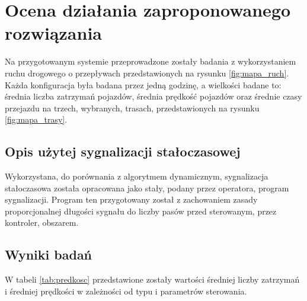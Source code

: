 \chapter{Ocena działania zaproponowanego rozwiązania}
\label{chap:ocena}
Na przygotowanym systemie przeprowadzone zostały badania z wykorzystaniem ruchu drogowego o przepływach przedstawionych na rysunku \ref{fig:mapa_ruch}. Każda konfiguracja była badana przez jedną godzinę, a wielkości badane to: średnia liczba zatrzymań pojazdów, średnia prędkość pojazdów oraz średnie czasy przejazdu na trzech, wybranych, trasach, przedstawionych na rysunku \ref{fig:mapa_trasy}.

\section{Opis użytej sygnalizacji stałoczasowej}
Wykorzystana, do porównania z algorytmem dynamicznym, sygnalizacja stałoczasowa została opracowana jako stały, podany przez operatora, program sygnalizacji. Program ten przygotowany został z zachowaniem zasady proporcjonalnej długości sygnału do liczby pasów przed sterowanym, przez kontroler, obszarem.

\section{Wyniki badań}
W tabeli \ref{tab:predkosc} przedstawione zostały wartości średniej liczby zatrzymań i średniej prędkości w zależności od typu i parametrów sterowania.

